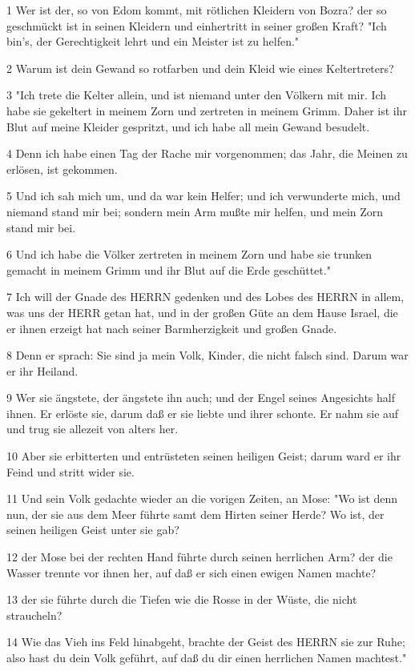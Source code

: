 \par 1 Wer ist der, so von Edom kommt, mit rötlichen Kleidern von Bozra? der so geschmückt ist in seinen Kleidern und einhertritt in seiner großen Kraft? "Ich bin's, der Gerechtigkeit lehrt und ein Meister ist zu helfen."
\par 2 Warum ist dein Gewand so rotfarben und dein Kleid wie eines Keltertreters?
\par 3 "Ich trete die Kelter allein, und ist niemand unter den Völkern mit mir. Ich habe sie gekeltert in meinem Zorn und zertreten in meinem Grimm. Daher ist ihr Blut auf meine Kleider gespritzt, und ich habe all mein Gewand besudelt.
\par 4 Denn ich habe einen Tag der Rache mir vorgenommen; das Jahr, die Meinen zu erlösen, ist gekommen.
\par 5 Und ich sah mich um, und da war kein Helfer; und ich verwunderte mich, und niemand stand mir bei; sondern mein Arm mußte mir helfen, und mein Zorn stand mir bei.
\par 6 Und ich habe die Völker zertreten in meinem Zorn und habe sie trunken gemacht in meinem Grimm und ihr Blut auf die Erde geschüttet."
\par 7 Ich will der Gnade des HERRN gedenken und des Lobes des HERRN in allem, was uns der HERR getan hat, und in der großen Güte an dem Hause Israel, die er ihnen erzeigt hat nach seiner Barmherzigkeit und großen Gnade.
\par 8 Denn er sprach: Sie sind ja mein Volk, Kinder, die nicht falsch sind. Darum war er ihr Heiland.
\par 9 Wer sie ängstete, der ängstete ihn auch; und der Engel seines Angesichts half ihnen. Er erlöste sie, darum daß er sie liebte und ihrer schonte. Er nahm sie auf und trug sie allezeit von alters her.
\par 10 Aber sie erbitterten und entrüsteten seinen heiligen Geist; darum ward er ihr Feind und stritt wider sie.
\par 11 Und sein Volk gedachte wieder an die vorigen Zeiten, an Mose: "Wo ist denn nun, der sie aus dem Meer führte samt dem Hirten seiner Herde? Wo ist, der seinen heiligen Geist unter sie gab?
\par 12 der Mose bei der rechten Hand führte durch seinen herrlichen Arm? der die Wasser trennte vor ihnen her, auf daß er sich einen ewigen Namen machte?
\par 13 der sie führte durch die Tiefen wie die Rosse in der Wüste, die nicht straucheln?
\par 14 Wie das Vieh ins Feld hinabgeht, brachte der Geist des HERRN sie zur Ruhe; also hast du dein Volk geführt, auf daß du dir einen herrlichen Namen machtest."
